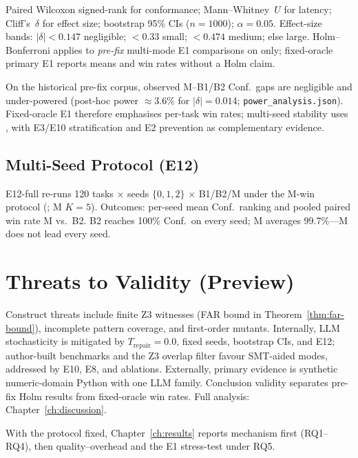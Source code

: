 Paired Wilcoxon signed-rank for conformance; Mann--Whitney~$U$ for latency;
Cliff's~$\delta$ for effect size; bootstrap 95\% CIs ($n{=}1000$);
$\alpha{=}0.05$.
Effect-size bands: $|\delta|{<}0.147$ negligible; ${<}0.33$ small;
${<}0.474$ medium; else large.
Holm--Bonferroni applies to \emph{pre-fix} multi-mode E1 comparisons on
 only; fixed-oracle primary E1 reports means and
win rates without a Holm claim.

On the historical pre-fix corpus, observed M--B1/B2 Conf.\ gaps are
negligible and under-powered (post-hoc power ${\approx}3.6\%$ for
$|\delta|{=}0.014$; \texttt{power\_analysis.json}).
Fixed-oracle E1 therefore emphasises per-task win rates; multi-seed
stability uses , with E3/E10 stratification and E2
prevention as complementary evidence.

\subsection{Multi-Seed Protocol (E12)}
\label{sec:exp:e12}

E12-full re-runs 120 tasks ${\times}$ seeds $\{0,1,2\}$ ${\times}$ B1/B2/M under
the M-win protocol (; M $K{=}5$).
Outcomes: per-seed mean Conf.\ ranking and pooled paired win rate M vs.\ B2.
B2 reaches 100\% Conf.\ on every seed; M averages 99.7\%---M does not lead
every seed.

\section{Threats to Validity (Preview)}
\label{sec:exp:threats-preview}

Construct threats include finite Z3 witnesses (FAR bound in
Theorem~\ref{thm:far-bound}), incomplete pattern coverage, and first-order
mutants.
Internally, LLM stochasticity is mitigated by $T_\text{repair}{=}0.0$, fixed
seeds, bootstrap CIs, and E12; author-built benchmarks and the Z3 overlap
filter favour SMT-aided modes, addressed by E10, E8, and ablations.
Externally, primary evidence is synthetic numeric-domain Python with one LLM
family.
Conclusion validity separates pre-fix Holm results from fixed-oracle win
rates.
Full analysis: Chapter~\ref{ch:discussion}.

With the protocol fixed, Chapter~\ref{ch:results} reports mechanism first
(RQ1--RQ4), then quality--overhead and the E1 stress-test under RQ5.

